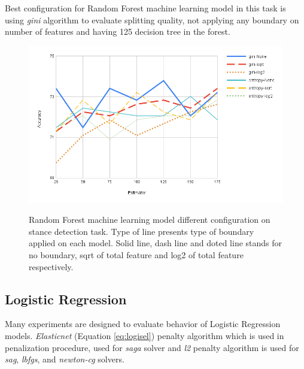 Best configuration for Random Forest machine learning model in this task is using \textit{gini} algorithm to evaluate splitting quality, not applying any boundary on number of features and having 125 decision tree in the forest. 
\begin{figure}%
	\centering
	{\includegraphics[width=12.5cm]{statistics/randomforest.png} }
	\caption{Random Forest machine learning model different configuration on stance detection task. Type of line presents type of boundary applied on each model. Solid line, dash line and doted line stands for no boundary, sqrt of total feature and log2 of total feature respectively.}%
	\label{fig:randomforest}%
\end{figure}
\subsection{Logistic Regression}
Many experiments are designed to evaluate behavior of Logistic Regression models. 	 \textit{Elasticnet} (Equation \ref{eq:logisel}) penalty algorithm which is used in penalization procedure, used for \textit{saga} solver and \textit{l2} penalty algorithm is used for \textit{sag}, \textit{lbfgs}, and \textit{newton-cg} solvers. 

